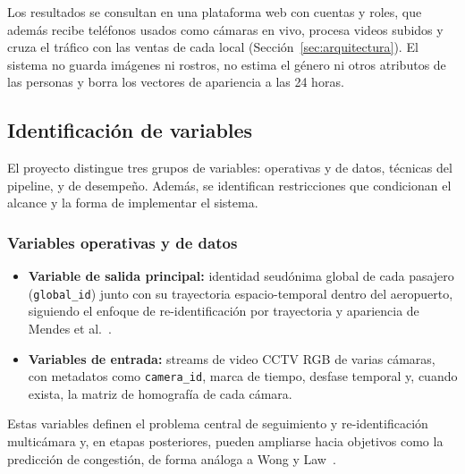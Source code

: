 \documentclass[12pt,a4paper]{article}
\begin{document}
Los resultados se consultan en una plataforma web con cuentas y roles, que
además recibe teléfonos usados como cámaras en vivo, procesa videos subidos y
cruza el tráfico con las ventas de cada local
(Sección~\ref{sec:arquitectura}). El sistema no guarda imágenes ni rostros,
no estima el género ni otros atributos de las personas y borra los vectores
de apariencia a las 24 horas.

\subsection{Identificación de variables}

El proyecto distingue tres grupos de variables: operativas y de datos,
técnicas del pipeline, y de desempeño. Además, se identifican
restricciones que condicionan el alcance y la forma de implementar el
sistema.

\subsubsection{Variables operativas y de datos}
\begin{itemize}
    \item \textbf{Variable de salida principal:} identidad seudónima global
    de cada pasajero (\texttt{global\_id}) junto con su trayectoria
    espacio-temporal dentro del aeropuerto, siguiendo el enfoque de
    re-identificación por trayectoria y apariencia de Mendes et
    al.~\cite{mendes2023}.
    \item \textbf{Variables de entrada:} streams de video CCTV RGB de
    varias cámaras, con metadatos como \texttt{camera\_id}, marca de
    tiempo, desfase temporal y, cuando exista, la matriz de homografía de
    cada cámara.
\end{itemize}
Estas variables definen el problema central de seguimiento y
re-identificación multicámara y, en etapas posteriores, pueden ampliarse
hacia objetivos como la predicción de congestión, de forma análoga a Wong
y Law~\cite{wonglaw2023}.
\end{document}
